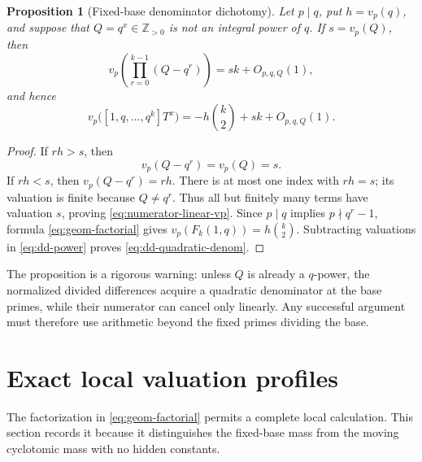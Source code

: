 \documentclass[11pt]{article}
\newtheorem{proposition}[theorem]{Proposition}
\theoremstyle{definition}
\theoremstyle{remark}
\newcommand{\Z}{\mathbb Z}
\begin{document}
\begin{proposition}[Fixed-base denominator dichotomy]
\label{prop:base-dichotomy}
Let $p\mid q$, put $h=v_p(q)$, and suppose that $Q=q^x\in\Z_{>0}$ is not an
integral power of $q$.  If $s=v_p(Q)$, then
\begin{equation}\label{eq:numerator-linear-vp}
 v_p\!\left(\prod_{r=0}^{k-1}(Q-q^r)\right)=sk+O_{p,q,Q}(1),
\end{equation}
and hence
\begin{equation}\label{eq:dd-quadratic-denom}
 v_p\bigl([1,q,\ldots,q^k]T^x\bigr)
 =-h\binom{k}{2}+sk+O_{p,q,Q}(1).
\end{equation}
\end{proposition}

\begin{proof}
If $rh>s$, then
\[
 v_p(Q-q^r)=v_p(Q)=s.
\]
If $rh<s$, then $v_p(Q-q^r)=rh$.  There is at most one index with $rh=s$;
its valuation is finite because $Q\neq q^r$.  Thus all but finitely many
terms have valuation $s$, proving \eqref{eq:numerator-linear-vp}.  Since
$p\mid q$ implies $p\nmid q^r-1$, formula \eqref{eq:geom-factorial} gives
$v_p(F_k(1,q))=h\binom{k}{2}$.  Subtracting valuations in
\eqref{eq:dd-power} proves \eqref{eq:dd-quadratic-denom}.
\end{proof}

The proposition is a rigorous warning: unless $Q$ is already a $q$-power,
the normalized divided differences acquire a quadratic denominator at the
base primes, while their numerator can cancel only linearly.  Any successful
argument must therefore use arithmetic beyond the fixed primes dividing the
base.

\section{Exact local valuation profiles}

The factorization in \eqref{eq:geom-factorial} permits a complete local
calculation.  This section records it because it distinguishes the fixed-base
mass from the moving cyclotomic mass with no hidden constants.
\end{document}
